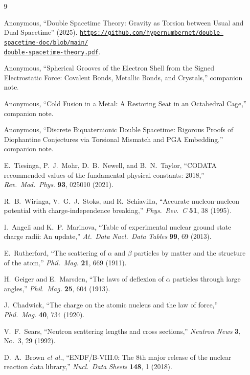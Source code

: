\documentclass[a4paper]{article}
\begin{document}
\begin{thebibliography}{9}

Anonymous,
``Double Spacetime Theory: Gravity as Torsion between Usual and Dual Spacetime'' (2025).
\href{https://github.com/hypernumbernet/double-spacetime-doc/blob/main/double-spacetime-theory.pdf}{%
\nolinkurl{https://github.com/hypernumbernet/double-spacetime-doc/blob/main/}\\%
\nolinkurl{double-spacetime-theory.pdf}}.

Anonymous,
``Spherical Grooves of the Electron Shell from the Signed Electrostatic Force: Covalent Bonds, Metallic Bonds, and Crystals,''
companion note.

Anonymous,
``Cold Fusion in a Metal: A Restoring Seat in an Octahedral Cage,''
companion note.

Anonymous,
``Discrete Biquaternionic Double Spacetime: Rigorous Proofs of Diophantine Conjectures via Torsional Mismatch and PGA Embedding,''
companion note.

E.~Tiesinga, P.~J.~Mohr, D.~B.~Newell, and B.~N.~Taylor,
``CODATA recommended values of the fundamental physical constants: 2018,''
\textit{Rev.\ Mod.\ Phys.} \textbf{93}, 025010 (2021).

R.~B.~Wiringa, V.~G.~J.~Stoks, and R.~Schiavilla,
``Accurate nucleon-nucleon potential with charge-independence breaking,''
\textit{Phys.\ Rev.\ C} \textbf{51}, 38 (1995).

I.~Angeli and K.~P.~Marinova,
``Table of experimental nuclear ground state charge radii: An update,''
\textit{At.\ Data Nucl.\ Data Tables} \textbf{99}, 69 (2013).

E.~Rutherford,
``The scattering of \(\alpha\) and \(\beta\) particles by matter and the structure of the atom,''
\textit{Phil.\ Mag.} \textbf{21}, 669 (1911).

H.~Geiger and E.~Marsden,
``The laws of deflexion of \(\alpha\) particles through large angles,''
\textit{Phil.\ Mag.} \textbf{25}, 604 (1913).

J.~Chadwick,
``The charge on the atomic nucleus and the law of force,''
\textit{Phil.\ Mag.} \textbf{40}, 734 (1920).

V.~F.~Sears,
``Neutron scattering lengths and cross sections,''
\textit{Neutron News} \textbf{3}, No.~3, 29 (1992).

D.~A.~Brown \textit{et al.},
``ENDF/B-VIII.0: The 8th major release of the nuclear reaction data library,''
\textit{Nucl.\ Data Sheets} \textbf{148}, 1 (2018).

\end{thebibliography}
\end{document}
